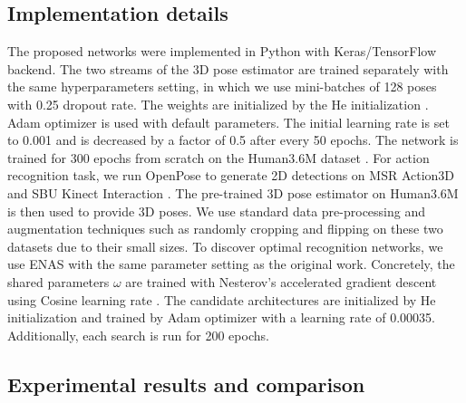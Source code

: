 \documentclass{bmvc2k}
\begin{document}
\subsection{Implementation details \\[-0.1cm]}
The proposed networks were implemented in Python with Keras/TensorFlow backend. The two streams of the 3D pose estimator are trained separately with the same hyperparameters setting, in which we use mini-batches of 128 poses with 0.25 dropout rate. The weights are initialized by the He initialization \cite{He2015DelvingDI}. Adam optimizer \cite{Kingma2014AdamAM} is used with default parameters. The initial learning rate is set to 0.001 and is decreased by a factor of 0.5 after every 50 epochs. The network is trained for 300 epochs from scratch on the Human3.6M dataset \cite{6682899}. For action recognition task, we run OpenPose \cite{cao2017realtime} to generate 2D detections on MSR Action3D \cite{li2010action} and SBU Kinect Interaction \cite{yun2012two}. The pre-trained 3D pose estimator on Human3.6M \cite{6682899} is then used to provide 3D poses. We use standard data pre-processing and augmentation techniques such as randomly cropping and flipping on these two datasets due to their small sizes. To discover optimal recognition networks, we use ENAS \cite{pmlr-v80-pham18a} with the same parameter setting as the original work. Concretely, the shared parameters $\omega$  are trained with Nesterov's accelerated gradient descent \cite{Nesterov} using Cosine learning rate \cite{Loshchilov2016SGDRSG}. The candidate architectures are initialized by He initialization \cite{He2015DelvingDI} and trained by Adam optimizer \cite{Kingma2014AdamAM} with a learning rate of 0.00035. Additionally, each search is run for 200 epochs.\\[-0.75cm]
\subsection{Experimental results and comparison \\[-0.1cm]} \label{sect:4.3}
\end{document}
